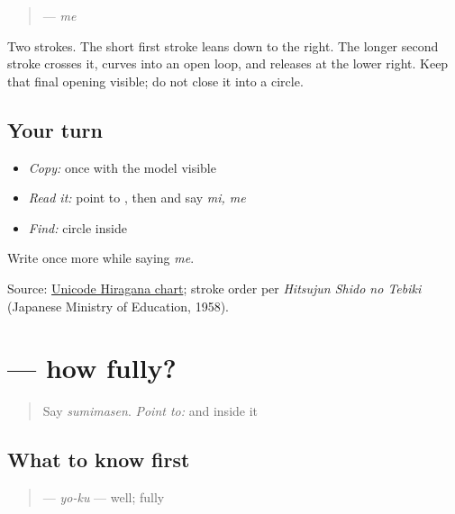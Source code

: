 \begin{quote}
\textbf{} — \emph{me}
\end{quote}

Two strokes. The short first stroke leans down to the right. The longer second stroke crosses it, curves into an open loop, and releases at the lower right. Keep that final opening visible; do not close it into a circle.

\subsection*{Your turn}
\begin{itemize}
\raggedright
  \item \emph{Copy:} \textbf{} once with the model visible
  \item \emph{Read it:} point to \textbf{}, then \textbf{} and say \emph{mi, me}
  \item \emph{Find:} circle \textbf{} inside \textbf{}
\end{itemize}

\begin{tcolorbox}[breakable,colback=teal!4,colframe=teal!35!black,title={Before you move on}]
Write \textbf{} once more while saying \emph{me}.

Source: \href{https://www.unicode.org/charts/PDF/U3040.pdf}{Unicode Hiragana chart}; stroke order per \emph{Hitsujun Shido no Tebiki} (Japanese Ministry of Education, 1958).
\end{tcolorbox}
\section[\texorpdfstring{\ja{よく} (yoku)}{よく (yoku)}]{ — how fully?}

\label{lesson:JA-C09-yoku}



\begin{quote}
Say \emph{sumimasen}. \emph{Point to:} \textbf{} and \textbf{} inside it
\end{quote}

\subsection*{What to know first}
\begin{quote}
\textbf{} — \emph{yo-ku} — well; fully
\end{quote}

